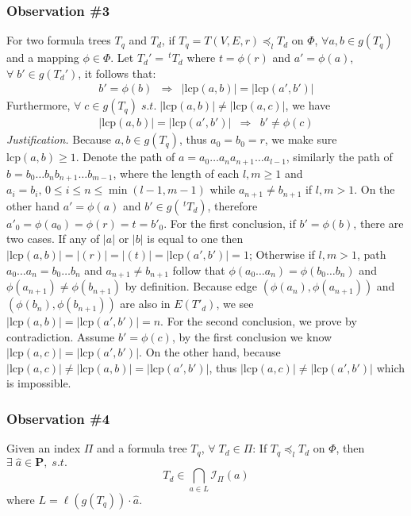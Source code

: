 \subsubsection*{Observation \#3} 
For two formula trees $T_q$ and $T_d$, if $T_q = T(V,E,r) \preceq_l T_d$ on $\Phi$,  
$\forall a,b \in g(T_q)$ and a mapping $\phi \in \Phi$. 
Let $T_d' = \, ^{t}T_d$ where $t = \phi(r)$ and $a' = \phi(a)$, $\forall\; b' \in g(T_d')$, it follows that:
$$
\begin{array}{lcr}
b' = \phi(b)  & \Rightarrow & 
\left| \mathrm{lcp}(a,b) \right| = \left| \mathrm{lcp}(a',b') \right|
\end{array}
$$
Furthermore, $\forall\; c \in g(T_q)\; s.t.\; \left| \mathrm{lcp}(a,b) \right| \neq \left| \mathrm{lcp}(a,c) \right| $, we have
$$
\begin{array}{lcr}
\left| \mathrm{lcp}(a,b) \right| = \left| \mathrm{lcp}(a',b') \right|
& \Rightarrow &
b' \neq \phi(c)
\end{array} 
$$
\textit{Justification.} 
Because $a,b \in g(T_q)$, thus $a_0 = b_0 = r$, we make sure $\mathrm{lcp}(a,b) \ge 1$. 
Denote the path of $a = a_0 \ldots a_n a_{n+1} \ldots a_{l-1}$, similarly the path of $b=b_0 \ldots b_n b_{n+1} \ldots b_{m-1}$,
where the length of each $l,m \ge 1$ and $a_i = b_i,\, 0 \le i \le n \le \min(l-1, m-1)$ while $a_{n+1} \neq b_{n+1}$ if $l,m > 1$.
On the other hand $a' = \phi(a)$ and $b' \in g(\,^{t}T_d)$, therefore $a'_0 = \phi(a_0) = \phi(r) = t = b'_0$.
For the first conclusion, if $b' = \phi(b)$, there are two cases. If any of $|a|$ or $|b|$ is equal to one then $\left| \mathrm{lcp}(a,b) \right| = |(r)| = |(t)| = \left| \mathrm{lcp}(a',b') \right| = 1$;
Otherwise if $l,m > 1$, path $a_0 \ldots a_n = b_0 \ldots b_n$ and $a_{n+1} \neq b_{n+1}$ follow that $\phi(a_0 \ldots a_n) = \phi(b_0 \ldots b_n)$ and $\phi(a_{n+1}) \neq \phi(b_{n+1})$ by definition.
Because edge $(\phi(a_n), \phi(a_{n+1}))$ and $(\phi(b_n), \phi(b_{n+1}))$ are also in $E(T'_d)$, 
we see $\left| \mathrm{lcp}(a,b) \right| = \left| \mathrm{lcp}(a',b') \right| = n$.
For the second conclusion, we prove by contradiction. 
Assume $b' = \phi(c)$, by the first conclusion we know $\left| \mathrm{lcp}(a,c) \right| = \left| \mathrm{lcp}(a',b') \right|$.
On the other hand, because $\left| \mathrm{lcp}(a,c) \right| \neq \left| \mathrm{lcp}(a,b) \right| =  \left| \mathrm{lcp}(a',b') \right|$, 
thus $\left| \mathrm{lcp}(a,c) \right| \neq \left| \mathrm{lcp}(a',b') \right|$ which is impossible. 

\subsubsection*{Observation \#4} 
Given an index $\Pi$ and a formula tree $T_q$, $\forall\; T_d \in \Pi$:
If $T_q \preceq_l T_d$ on $\Phi$, then $\exists\; \hat{a} \in \mathbf{P},\; s.t.$
$$
T_d \in \bigcap_{a \in L} \mathcal{I}_{\Pi}(a)
$$
where $L = \ell(g(T_q)) \cdot \hat{a}$. 

